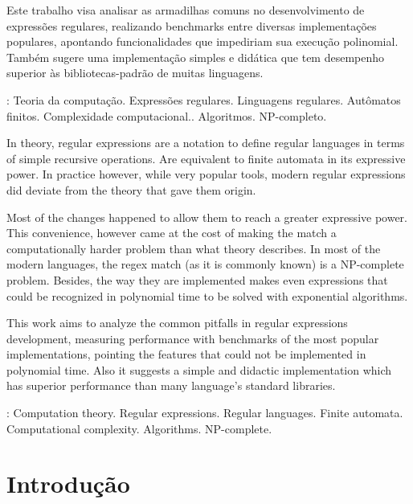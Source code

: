 \documentclass[a4paper,12pt,oneside,onecolumn]{uerj}
\begin{document}
Este trabalho visa analisar as armadilhas comuns no desenvolvimento de expressões regulares, realizando benchmarks entre diversas implementações populares, apontando funcionalidades que impediriam sua execução polinomial. Também sugere uma implementação simples e didática que tem desempenho superior às bibliotecas-padrão de muitas linguagens.

: Teoria da computação. Expressões regulares. Linguagens regulares. Autômatos finitos. Complexidade computacional.. Algoritmos. NP-completo.



In theory, regular expressions are a notation to define regular languages in terms of simple recursive operations. Are equivalent to finite automata in its expressive power. In practice however, while very popular tools, modern regular expressions did deviate from the theory that gave them origin.

Most of the changes happened to allow them to reach a greater expressive power. This convenience, however came at the cost of making the match a computationally harder problem than what theory describes. In most of the modern languages, the regex match (as it is commonly known) is a NP-complete problem. Besides, the way they are implemented makes even expressions that could be recognized in polynomial time to be solved with exponential algorithms.

This work aims to analyze the common pitfalls in regular expressions development, measuring performance with benchmarks of the most popular implementations, pointing the features that could not be implemented in polynomial time. Also it suggests a simple and didactic implementation which has superior performance than many language's standard libraries.

: Computation theory. Regular expressions. Regular languages. Finite automata. Computational complexity. Algorithms. NP-complete.

\listadefiguras
\listadetabelas

\sumario

\mainmatter

\chapter{Introdução}
\end{document}
